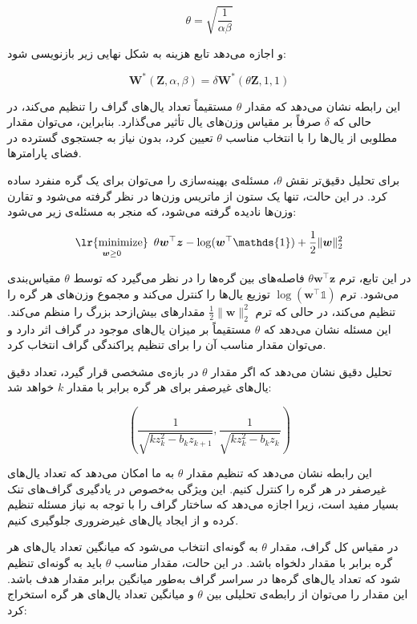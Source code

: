 \documentclass[10pt,twocolumn,a4paper]{article}
\newcommand\minimize[1]{\mathop{\text{\lr{minimize}}}\limits_{#1}\ }
\begin{document}
	\[
		\theta = \sqrt{\frac{1}{\alpha \beta}}
	\]

	و اجازه می‌دهد تابع هزینه به شکل نهایی زیر بازنویسی شود:

	\[
		\bm{W}^*(\bm{Z}, \alpha, \beta) = \delta \bm{W}^*(\theta \bm{Z}, 1, 1)
	\]

	این رابطه نشان می‌دهد که مقدار \( \theta \) مستقیماً تعداد یال‌های گراف را تنظیم می‌کند، در حالی که \( \delta \) صرفاً بر مقیاس وزن‌های یال تأثیر می‌گذارد. بنابراین، می‌توان مقدار مطلوبی از یال‌ها را با انتخاب مناسب \( \theta \) تعیین کرد، بدون نیاز به جستجوی گسترده در فضای پارامترها.

	برای تحلیل دقیق‌تر نقش \( \theta \)، مسئله‌ی بهینه‌سازی را می‌توان برای یک گره منفرد ساده کرد. در این حالت، تنها یک ستون از ماتریس وزن‌ها در نظر گرفته می‌شود و تقارن وزن‌ها نادیده گرفته می‌شود، که منجر به مسئله‌ی زیر می‌شود:

	\[
		\minimize{\bm{w} \geq 0} \theta \bm{w}^\top \bm{z} - \log(\bm{w}^\top \mathds{1}) + \frac{1}{2} \|\bm{w}\|_2^2
	\]

	در این تابع، ترم \( \theta \bm{w}^\top \bm{z} \) فاصله‌های بین گره‌ها را در نظر می‌گیرد که توسط \( \theta \) مقیاس‌بندی می‌شود. ترم \( \log(\bm{w}^\top \mathds{1}) \) توزیع یال‌ها را کنترل می‌کند و مجموع وزن‌های هر گره را تنظیم می‌کند، در حالی که ترم \( \frac{1}{2} \|\bm{w}\|_2^2 \) مقدارهای بیش‌ازحد بزرگ را منظم می‌کند. این مسئله نشان می‌دهد که \( \theta \) مستقیماً بر میزان یال‌های موجود در گراف اثر دارد و می‌توان مقدار مناسب آن را برای تنظیم پراکندگی گراف انتخاب کرد.

	تحلیل دقیق نشان می‌دهد که اگر مقدار \( \theta \) در بازه‌ی مشخصی قرار گیرد، تعداد دقیق یال‌های غیرصفر برای هر گره برابر با مقدار \( k \) خواهد شد:

	\begin{equation}
		\left( \frac{1}{\sqrt{k z_k^2 - b_k z_{k+1}}}, \frac{1}{\sqrt{k z_k^2 - b_k z_k}} \right)
	\end{equation}

	این رابطه نشان می‌دهد که تنظیم مقدار \( \theta \) به ما امکان می‌دهد که تعداد یال‌های غیرصفر در هر گره را کنترل کنیم. این ویژگی به‌خصوص در یادگیری گراف‌های تنک بسیار مفید است، زیرا اجازه می‌دهد که ساختار گراف را با توجه به نیاز مسئله تنظیم کرده و از ایجاد یال‌های غیرضروری جلوگیری کنیم.

	در مقیاس کل گراف، مقدار \( \theta \) به گونه‌ای انتخاب می‌شود که میانگین تعداد یال‌های هر گره برابر با مقدار دلخواه باشد. در این حالت، مقدار مناسب \( \theta \) باید به گونه‌ای تنظیم شود که تعداد یال‌های گره‌ها در سراسر گراف به‌طور میانگین برابر مقدار هدف باشد. این مقدار را می‌توان از رابطه‌ی تحلیلی بین \( \theta \) و میانگین تعداد یال‌های هر گره استخراج کرد:
\end{document}
